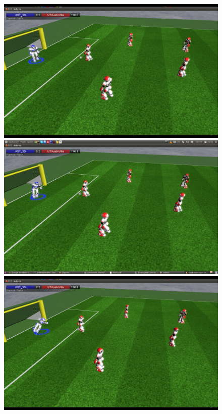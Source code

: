 \begin{figure}[t!] 
\centering    
	\includegraphics[trim = 5cm 10cm 30cm 5cm, clip,scale=0.25]{Chapter3/figures/GoalieFall.png}
	\quad \quad
	\includegraphics[trim = 5cm 10cm 30cm 5cm, clip,scale=0.25]{Chapter3/figures/GoalieFall2.png}\\
	\vspace*{1cm}
	\includegraphics[trim = 5cm 10cm 30cm 5cm, clip,scale=0.25]{Chapter3/figures/GoalieFall3.png}

\end{figure}
